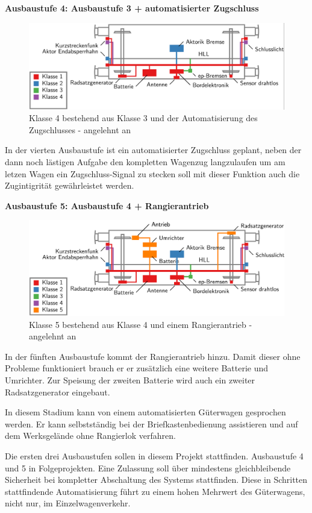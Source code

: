 \textbf{Ausbaustufe 4: Ausbaustufe 3 + automatisierter Zugschluss}\par
\begin{figure}[htbp] 
    \includegraphics[width=\textwidth]{Bilder/Ausbaustufen_4.PNG}
    \caption{Klasse 4 bestehend aus Klasse 3 und der Automatisierung des Zugschlusses - angelehnt an \cite{ETR_3}}
    \label{fig:Klasse4}
\end{figure} 
In der vierten Ausbaustufe ist ein automatisierter Zugschluss geplant, neben der dann noch lästigen Aufgabe den kompletten Wagenzug langzulaufen um am letzen Wagen ein Zugschluss-Signal zu stecken soll mit dieser Funktion auch die Zugintigrität gewährleistet werden.\par
\textbf{Ausbaustufe 5: Ausbaustufe 4 + Rangierantrieb}\par
\begin{figure}[htbp] 
    \includegraphics[width=\textwidth]{Bilder/Ausbaustufen_5.PNG}
    \caption{Klasse 5 bestehend aus Klasse 4 und einem Rangierantrieb - angelehnt an \cite{ETR_3}}
    \label{fig:Klasse5}
\end{figure} 
In der fünften Ausbaustufe kommt der Rangierantrieb hinzu. Damit dieser ohne Probleme funktioniert brauch er er zusätzlich eine weitere Batterie und Umrichter. Zur Speisung der zweiten Batterie wird auch ein zweiter Radsatzgenerator eingebaut.\par
In diesem Stadium kann von einem automatisierten Güterwagen gesprochen werden. Er kann selbstständig bei der Briefkastenbedienung assistieren und auf dem Werksgelände ohne Rangierlok verfahren.\par
Die ersten drei Ausbaustufen sollen in diesem Projekt stattfinden. Ausbaustufe 4 und 5 in Folgeprojekten. Eine Zulassung soll über mindestens gleichbleibende Sicherheit bei kompletter Abschaltung des Systems stattfinden. Diese in Schritten stattfindende Automatisierung führt zu einem hohen Mehrwert des Güterwagens, nicht nur, im Einzelwagenverkehr.
